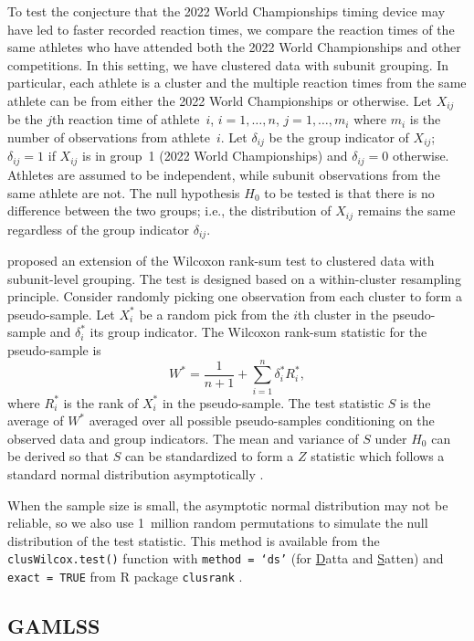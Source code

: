 \documentclass[12pt, letterpaper]{article}
\begin{document}
To test the conjecture that the 2022 World Championships timing device may have 
led to faster recorded reaction times, we compare the reaction times of the same
athletes who have attended both the 2022 World Championships and other 
competitions. 
In this setting, we have clustered data with subunit grouping. In particular,
each athlete is a cluster and the multiple reaction times from the same athlete
can be from either the 2022 World Championships or otherwise.
Let $X_{ij}$ be the $j$th reaction time of athlete~$i$, $i = 1, \ldots, n$,
$j = 1, \ldots, m_i$ where $m_i$ is the number of observations from
athlete~$i$. Let $\delta_{ij}$ be the group indicator of $X_{ij}$; $\delta_{ij}
= 1$ if $X_{ij}$ is in group~1 (2022 World Championships) and $\delta_{ij} = 0$ 
otherwise. Athletes are
assumed to be independent, while subunit observations from the same athlete are
not. The null hypothesis $H_0$ to be tested is that there is no difference
between the two groups; i.e., the distribution of $X_{ij}$ remains the same
regardless of the group indicator $\delta_{ij}$.


\citet{datta2005rank} proposed an extension of the Wilcoxon rank-sum test to
clustered data with subunit-level grouping. The test is designed based on a
within-cluster resampling principle. Consider randomly picking one observation
from each cluster to form a pseudo-sample. Let $X_i^*$ be a random pick from the
$i$th cluster in the pseudo-sample and $\delta_i^*$ its group indicator. The
Wilcoxon rank-sum statistic for the pseudo-sample is
\[
W^* = \frac{1}{n + 1} + \sum_{i=1}^{n} \delta_{i}^{*} R_{i}^{*},
\]
where $R_{i}^{*}$ is the rank of $X_{i}^{*}$ in the pseudo-sample.
The test statistic $S$ is the average of $W^*$ averaged over all possible
pseudo-samples conditioning on the observed data and group indicators.
The mean and variance of $S$ under $H_0$ can be derived so that $S$ can be
standardized to form a $Z$ statistic which follows a standard normal distribution
asymptotically \citep[p.910]{datta2005rank}.


When the sample size is small, the asymptotic normal distribution may
not be reliable, so we also use 1~million random permutations to
simulate the null distribution of the test statistic.
This method is available from the \texttt{clusWilcox.test()} function
with \texttt{method = `ds'} (for \underline{D}atta and \underline{S}atten) and 
\texttt{exact = TRUE} from R package
\texttt{clusrank} \citep{jiang2020wilcoxon}. 


\subsection{GAMLSS}\label{sec:gamlss}
\end{document}
